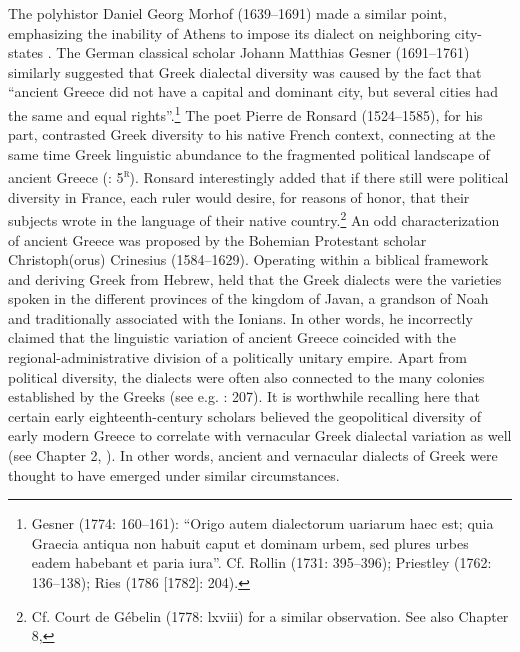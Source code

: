 \documentclass[output=paper]{langsci/langscibook}
\begin{document}
The polyhistor Daniel Georg Morhof (1639–1691) made a similar point, emphasizing the inability of Athens to impose its dialect on neighboring city-states \citep[146]{Morhof1685}. The German classical scholar Johann Matthias Gesner (1691–1761) similarly suggested that Greek dialectal diversity was caused by the fact that “ancient Greece did not have a capital and dominant city, but several cities had the same and equal rights”.\footnote{Gesner (1774: 160–161): “Origo autem dialectorum uariarum haec est; quia Graecia antiqua non habuit caput et dominam urbem, sed plures urbes eadem habebant et paria iura”. Cf. Rollin (1731: 395–396); Priestley (1762: 136–138); Ries (1786 [1782]: 204).} The poet Pierre de Ronsard (1524–1585), for his part, contrasted Greek diversity to his native French context, connecting at the same time Greek linguistic abundance to the fragmented political landscape of ancient Greece (\citealt{Ronsard1565}: 5\textsc{\textsuperscript{r}}). Ronsard interestingly added that if there still were political diversity in France, each ruler would desire, for reasons of honor, that their subjects wrote in the language of their native country.\footnote{Cf. Court de Gébelin (1778: lxviii) for a similar observation. See also Chapter 8, } An odd characterization of ancient Greece was proposed by the Bohemian Protestant scholar Christoph(orus) Crinesius (1584–1629). Operating within a biblical framework and deriving Greek from Hebrew, \citet[77]{Crinesius1629} held that the Greek dialects were the varieties spoken in the different provinces of the kingdom of Javan, a grandson of Noah and traditionally associated with the Ionians. In other words, he incorrectly claimed that the linguistic variation of ancient Greece coincided with the regional-administrative division of a politically unitary empire. Apart from political diversity, the dialects were often also connected to the many colonies established by the Greeks (see e.g. \citealt{Simonis1752}: 207). It is worthwhile recalling here that certain early eighteenth-century scholars believed the geopolitical diversity of early modern Greece to correlate with vernacular Greek dialectal variation as well (see Chapter 2, ). In other words, ancient and vernacular dialects of Greek were thought to have emerged under similar circumstances.
\end{document}
